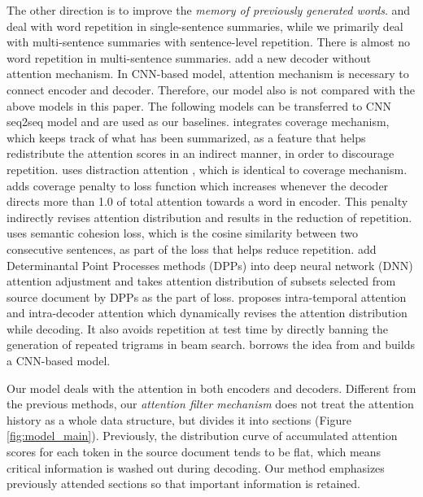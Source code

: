 \documentclass{nle}
\theoremstyle{definition}
\newcommand{\figref}[1]{Figure \ref{#1}}
\begin{document}
The other direction is to improve the 
{\em memory of previously generated words}.
\cite{SuzukiN17} and \cite{LinSMS18} 
deal with word repetition in single-sentence summaries, 
while we primarily deal with multi-sentence summaries with 
sentence-level repetition. 
There is almost no word repetition in multi-sentence summaries.
\cite{JiangB18} add a new decoder without attention mechanism.
In CNN-based model, attention mechanism is necessary to connect encoder 
and decoder.
Therefore, our model also is not compared with the above models in this paper. 
The following models can be transferred to CNN seq2seq model and
are used as our baselines.
\cite{SeeLM17} integrates coverage mechanism, 
which keeps track of what has been summarized, as a feature that helps 
redistribute the attention scores in an indirect manner,
in order to discourage repetition. 
\cite{TanWX17} uses distraction attention
\citep{ChenZLWJ16}, which is identical to coverage mechanism. 
\cite{GehrmannDR18} adds coverage penalty to loss function
which increases whenever the decoder directs more than 1.0 of total attention
towards a word in encoder.
This penalty indirectly revises attention distribution and results in
the reduction of repetition.
\cite{elikyilmazBHC18} uses semantic cohesion loss,
which is the cosine similarity between two consecutive sentences, as part of
the loss that helps reduce repetition.
\cite{DivC2C19} add Determinantal Point Processes methods (DPPs)
into deep neural network (DNN) attention adjustment
and takes attention distribution of
subsets selected from source document by DPPs as the part of loss.
\cite{PaulusXS17} proposes intra-temporal attention \citep{NallapatiZSGX16} and 
intra-decoder attention which dynamically revises the attention distribution while decoding. 
It also avoids repetition at test time by directly banning the generation of 
repeated trigrams in beam search. 
\cite{FanGA18} borrows the idea from \cite{PaulusXS17} and 
builds a CNN-based model. 

Our model deals with the attention in both encoders and decoders. 
Different from the previous methods, 
our \textit{attention filter mechanism} does not 
treat the attention history as a whole data structure,  
but divides it into sections (\figref{fig:model_main}). 
Previously, the distribution curve of accumulated attention scores 
for each token in the source document tends to be flat, 
which means critical information is washed out during decoding.
Our method emphasizes previously attended sections 
so that important information is retained.
\end{document}
